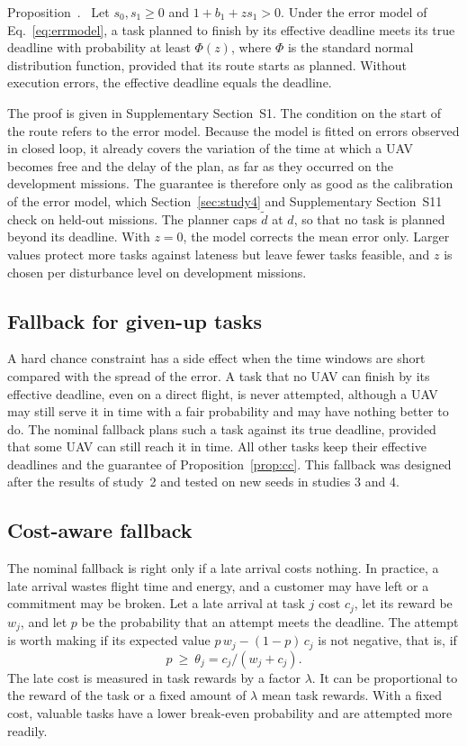 \documentclass[a4paper,fleqn]{cas-dc}
\newcounter{prop}
\newenvironment{prop}{\par\smallskip\refstepcounter{prop}\noindent Proposition~\theprop.\ }{\par\smallskip}
\begin{document}
\begin{prop}\label{prop:cc}
Let $s_0,s_1\ge0$ and $1+b_1+zs_1>0$. Under the error model of Eq.~\eqref{eq:errmodel}, a task planned to finish by its
effective deadline meets its true deadline with probability at least $\Phi(z)$, where $\Phi$ is the standard normal
distribution function, provided that its route starts as planned. Without execution errors, the effective deadline
equals the deadline.
\end{prop}

The proof is given in Supplementary Section~S1. The condition on the start of the route refers to the
error model. Because the model is fitted on errors observed in closed loop, it already covers the variation of the time
at which a UAV becomes free and the delay of the plan, as far as they occurred on the development missions. The
guarantee is therefore only as good as the calibration of the error model, which Section~\ref{sec:study4} and Supplementary Section~S11 check on held-out
missions. The planner caps $\tilde d$ at $d$, so that no task is planned beyond its deadline. With $z=0$, the model
corrects the mean error only. Larger values protect more tasks against lateness but leave fewer tasks feasible, and $z$
is chosen per disturbance level on development missions.

\subsection{Fallback for given-up tasks}\label{sec:fallback}
A hard chance constraint has a side effect when the time windows are short compared with the spread of the error. A
task that no UAV can finish by its effective deadline, even on a direct flight, is never attempted, although a UAV may
still serve it in time with a fair probability and may have nothing better to do. The nominal fallback plans such a
task against its true deadline, provided that some UAV can still reach it in time. All other tasks keep their effective
deadlines and the guarantee of Proposition~\ref{prop:cc}. This fallback was designed after the results of study~2 and
tested on new seeds in studies 3 and 4.

\subsection{Cost-aware fallback}\label{sec:costfb}
The nominal fallback is right only if a late arrival costs nothing. In practice, a late arrival wastes flight time and
energy, and a customer may have left or a commitment may be broken. Let a late arrival at task $j$ cost $c_j$, let its
reward be $w_j$, and let $p$ be the probability that an attempt meets the deadline. The attempt is worth making if its
expected value $p\,w_j-(1-p)\,c_j$ is not negative, that is, if
\begin{equation}\label{eq:theta}
p\ \ge\ \theta_j=c_j/(w_j+c_j).
\end{equation}
The late cost is measured in task rewards by a factor $\lambda$. It can be proportional to the reward of the task or a
fixed amount of $\lambda$ mean task rewards. With a fixed cost, valuable tasks have a lower break-even probability and
are attempted more readily.
\end{document}
